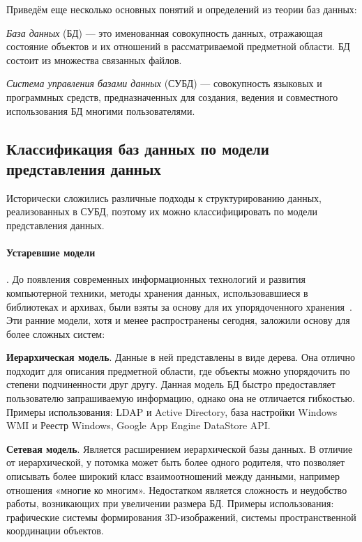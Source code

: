 Приведём еще несколько основных понятий и определений из теории баз данных:
\begin{compactitem}
	\item \textit{База данных} (БД) --- это именованная совокупность данных,
	отражающая состояние объектов и их отношений в рассматриваемой предметной области.
	БД состоит из множества связанных файлов.
	\item \textit{Система управления базами данных} (СУБД) --- совокупность языковых и программных средств,
	предназначенных для создания, ведения и совместного использования БД многими пользователями.
\end{compactitem}




\subsection{Классификация баз данных по модели представления данных}

Исторически сложились различные подходы к структурированию данных, реализованных в СУБД, поэтому их можно
классифицировать по модели представления данных.

\paragraph{Устаревшие модели}. До появления современных информационных технологий и
развития компьютерной техники, методы хранения данных, использовавшиеся в библиотеках и архивах,
были взяты за основу для их упорядоченного хранения~\cite{koryaginModeliBazDannyh2020}.
Эти ранние модели, хотя и менее распространены сегодня, заложили основу для более сложных систем:
\begin{compactitem}
	\item \textbf{Иерархическая модель}. Данные в ней представлены в виде дерева.
	Она отлично подходит для описания предметной области,
	где объекты можно упорядочить по степени подчиненности друг другу.
	Данная модель БД быстро предоставляет пользователю запрашиваемую информацию,
	однако она не отличается гибкостью. Примеры использования: LDAP и Active Directory,
	база настройки Windows WMI и Реестр Windows, Google App Engine DataStore API.
	\item\textbf{Сетевая модель}. Является расширением иерархической базы данных.
	В отличие от иерархической, у потомка может быть более одного родителя,
	что позволяет описывать более широкий класс взаимоотношений между данными, например отношения «многие ко многим».
	Недостатком является сложность и неудобство работы, возникающих при увеличении размера БД. Примеры использования:
	графические системы формирования 3D-изображений, системы пространственной координации объектов.
\end{compactitem}

